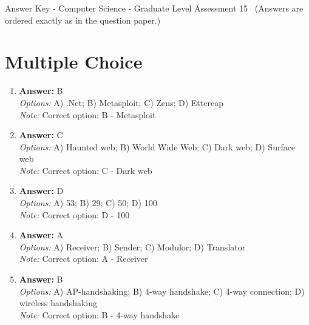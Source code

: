 \documentclass[12pt]{article}
\begin{document}
\begin{center}
Answer Key - Computer Science - Graduate Level Assessment 15 \
\small (Answers are ordered exactly as in the question paper.)
\end{center}

\section*{Multiple Choice}
\begin{enumerate}[label=\arabic*.]
\item \textbf{Answer:} B
\\ \textit{Options:} A) .Net; B) Metasploit; C) Zeus; D) Ettercap
\\ \textit{Note:} Correct option: B - Metasploit
\item \textbf{Answer:} C
\\ \textit{Options:} A) Haunted web; B) World Wide Web; C) Dark web; D) Surface web
\\ \textit{Note:} Correct option: C - Dark web
\item \textbf{Answer:} D
\\ \textit{Options:} A) 53; B) 29; C) 50; D) 100
\\ \textit{Note:} Correct option: D - 100
\item \textbf{Answer:} A
\\ \textit{Options:} A) Receiver; B) Sender; C) Modulor; D) Translator
\\ \textit{Note:} Correct option: A - Receiver
\item \textbf{Answer:} B
\\ \textit{Options:} A) AP-handshaking; B) 4-way handshake; C) 4-way connection; D) wireless handshaking
\\ \textit{Note:} Correct option: B - 4-way handshake
\end{enumerate}
\end{document}
